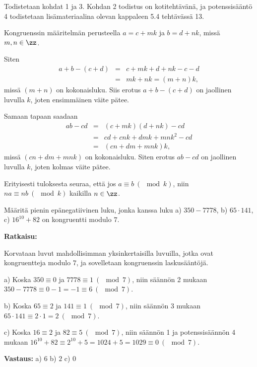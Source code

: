 \begin{todistus}
Todistetaan kohdat 1 ja 3. Kohdan 2 todistus on kotitehtävänä, ja potenssisääntö 4 todistetaan lisämateriaalina olevan kappaleen 5.4 tehtävässä 13.

Kongruenssin määritelmän perusteella $a=c + mk$ ja $b= d + nk$, missä $m, n\in \zz$.

Siten
\begin{eqnarray*}
a+b - (c+d) &=& c + mk + d + nk - c - d\\ &=& mk + nk = (m+n)k,
\end{eqnarray*}
missä $(m+n)$ on kokonaisluku. Siis erotus $a + b - (c+d)$ on jaollinen luvulla $k$, joten ensimmäinen väite pätee.

Samaan tapaan saadaan
\begin{eqnarray*}
ab - cd &=& (c + mk)(d + nk) - cd\\ &=& cd +c nk + d mk + mnk^2 - cd\\ &=& (cn+dm+mnk)k,
\end{eqnarray*}
missä $(cn+dm+mnk)$ on kokonaisluku. Siten erotus $ab - cd$ on jaollinen luvulla $k$, joten kolmas väite pätee.
\end{todistus}


Erityisesti tuloksesta seuraa, että  jos $a\equiv b \ (\mod k)$, niin $na\equiv nb
\ (\mod k)$ kaikilla $n\in \zz$.


\begin{esimerkki}
Määritä pienin epänegatiivinen luku, jonka kanssa luku a) $350 - 7778$, b) $65 \cdot 141$, c) $16^{10} + 82$ on kongruentti modulo $7$.

{\bf Ratkaisu:}

Korvataan luvut mahdollisimman yksinkertaisilla luvuilla, jotka ovat kongruentteja modulo $7$, ja sovelletaan kongruenssin laskusääntöjä.

a)
Koska $350 \equiv 0$ ja $7778 \equiv 1 \ (\mod 7)$, niin säännön 2 mukaan $350 - 7778 \equiv 0 - 1 = -1 \equiv 6 \ (\mod 7)$.

b)
Koska $65 \equiv 2$ ja $141 \equiv 1 \ (\mod 7)$, niin säännön 3 mukaan $65 \cdot 141 \equiv 2 \cdot 1 = 2 \ (\mod 7)$.

c)
Koska $16 \equiv 2$ ja $82 \equiv 5 \ (\mod 7)$, niin säännön 1 ja potenssisäännön 4 mukaan
$16^{10} + 82 \equiv 2^{10} + 5 = 1024 + 5 = 1029 \equiv 0 \ (\mod 7)$.

{\bf Vastaus:} a) $6$ b) $2$ c) $0$
\end{esimerkki}

